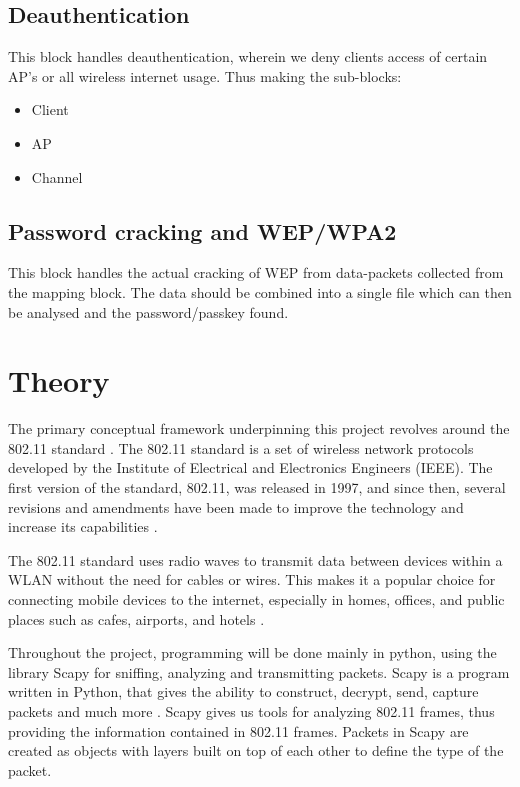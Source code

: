\subsection{Deauthentication}
This block handles deauthentication, wherein we deny clients access of certain AP's or all wireless internet usage. Thus making the sub-blocks: 
\begin{itemize}
    \item Client
    \item AP
    \item Channel
\end{itemize}


\subsection{Password cracking and WEP/WPA2}
This block handles the actual cracking of WEP from data-packets collected from the mapping block. The data should be combined into a single file which can then be analysed and the password/passkey found.

\section{Theory}
The primary conceptual framework underpinning this project revolves around the 802.11 standard \cite{IEEE802.11}. The 802.11 standard is a set of wireless network protocols developed by the Institute of Electrical and Electronics Engineers (IEEE). The first version of the standard, 802.11, was released in 1997, and since then, several revisions and amendments have been made to improve the technology and increase its capabilities \cite{ETHW}.

The 802.11 standard uses radio waves to transmit data between devices within a WLAN without the need for cables or wires. This makes it a popular choice for connecting mobile devices to the internet, especially in homes, offices, and public places such as cafes, airports, and hotels \cite{Public_WiFi}.

Throughout the project, programming will be done mainly in python, using the library Scapy for sniffing, analyzing and transmitting packets. Scapy is a program written in Python, that gives the ability to construct, decrypt, send, capture packets and much more \cite{IEEE_Scapy}. Scapy gives us tools for analyzing 802.11 frames, thus providing the information contained in 802.11 frames. Packets in Scapy are created as objects with layers built on top of each other to define the type of the packet.
\\

